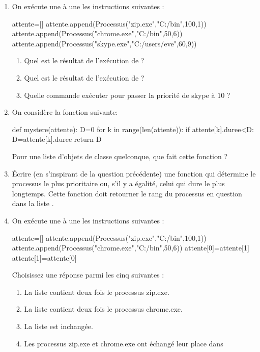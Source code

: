 \documentclass[11pt,a4paper,french,twoside]{VcCours}
\begin{document}
\begin{enumerate}
    \item On exécute une à une les instructions suivantes :
\begin{Python}
attente=[]
attente.append(Processus("zip.exe","C:/bin",100,1))
attente.append(Processus("chrome.exe","C:/bin",50,6))
attente.append(Processus("skype.exe","C:/users/eve",60,9))
\end{Python}
\begin{enumerate}
    \item Quel est le résultat de l'exécution de  ?
    \item Quel est le résultat de l'exécution de  ?
    \item Quelle commande exécuter pour passer la priorité de skype à $10$ ?
\end{enumerate}    
    \item On considère la fonction suivante:
\begin{Python}
def mystere(attente):
    D=0
    for k in range(len(attente)):
        if attente[k].duree<D:
            D=attente[k].duree
    return D
\end{Python}
    Pour une liste  d'objets de classe  quelconque,
    que fait cette fonction ?
    \item Écrire (en s'inspirant de la question précédente) une fonction 
     qui détermine
    le processus le plus prioritaire ou, s'il y a égalité, celui qui dure le 
    plus longtemps.
    Cette fonction doit retourner le rang du processus en question dans 
    la liste .
    \item On exécute une à une les instructions suivantes :
\begin{Python}
attente=[]
attente.append(Processus("zip.exe","C:/bin",100,1))
attente.append(Processus("chrome.exe","C:/bin",50,6))
attente[0]=attente[1]
attente[1]=attente[0]
\end{Python}
    Choisissez une réponse parmi les cinq suivantes :
    \begin{enumerate}
        \item La liste  contient deux fois le processus zip.exe. 
        \item La liste  contient deux fois le processus chrome.exe. 
        \item La liste  est inchangée. 
        \item Les processus zip.exe et chrome.exe ont échangé leur place dans 

\end{enumerate}
\end{enumerate}
\end{document}
